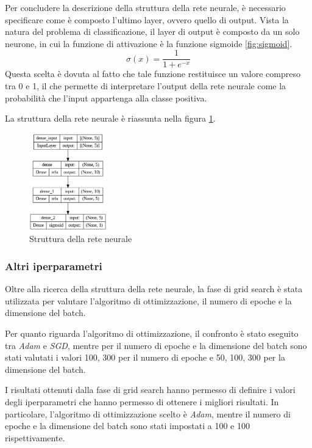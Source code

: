 Per concludere la descrizione della struttura della rete neurale, è necessario
specificare come è composto l'ultimo layer, ovvero quello di output. Vista la
natura del problema di classificazione, il layer di output è composto da un solo
neurone, in cui la funzione di attivazione è la funzione sigmoide \ref{fig:sigmoid}.
\begin{equation}
    \sigma(x) = \frac{1}{1 + e^{-x}}
\end{equation}
Questa scelta è dovuta al fatto che tale funzione restituisce un valore compreso
tra 0 e 1, il che permette di interpretare l'output della rete neurale come la
probabilità che l'input appartenga alla classe positiva.

La struttura della rete neurale è riassunta nella figura \ref{fig:strutturaReteNeurale}.
\begin{figure}[!ht]
    \centering
    \includegraphics[width=0.3\textwidth]{img/rete/struttura_rete.png}
    \caption{Struttura della rete neurale}
    \label{fig:strutturaReteNeurale}
\end{figure}
\subsubsection{Altri iperparametri} %
Oltre alla ricerca della struttura della rete neurale, la fase di grid search è
stata utilizzata per valutare l'algoritmo di ottimizzazione, il numero di epoche
e la dimensione del batch.

Per quanto riguarda l'algoritmo di ottimizzazione, il confronto è stato eseguito
tra \textit{Adam} e \textit{SGD}, mentre per il numero di epoche e la dimensione
del batch sono stati valutati i valori 100, 300 per il numero di epoche e 50,
100, 300 per la dimensione del batch.

I risultati ottenuti dalla fase di grid search hanno permesso di definire i valori
degli iperparametri che hanno permesso di ottenere i migliori risultati. In
particolare, l'algoritmo di ottimizzazione scelto è \textit{Adam}, mentre il
numero di epoche e la dimensione del batch sono stati impostati a 100 e 100
rispettivamente.

